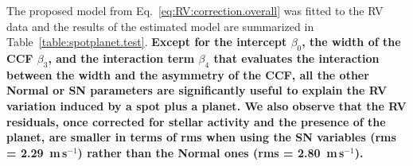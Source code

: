 \documentclass{aa}
\def\ms{\hbox{\,m\,s$^{-1}$}}         %
\begin{document}
The proposed model from Eq.~\eqref{eq:RV:correction.overall} was fitted to the RV data and the results of the estimated model are summarized in Table~\ref{table:spotplanet.test}.   {\bf{Except for the intercept $\beta_0$, the width of the CCF $\beta_3$, and the interaction term $\beta_4$ that evaluates the interaction between the width and the asymmetry of the CCF, all the other Normal or SN parameters are significantly useful to explain the RV variation induced by a spot plus a planet. We also observe that the RV residuals, once corrected for stellar activity and the presence of the planet, are smaller in terms of rms when using the SN variables (rms = 2.29 \ms) rather than the Normal ones (rms = 2.80 \ms).}}
\end{document}

